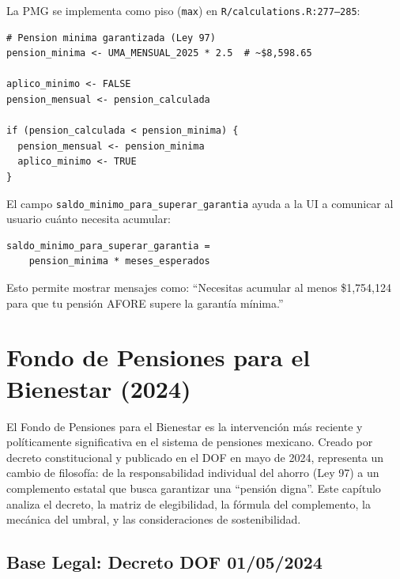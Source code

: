 \documentclass[11pt,a4paper]{report}
\begin{document}
\begin{tcolorbox}[colback=orange!5!white, colframe=orange!75!black, title=\textbf{Aplicaci\'on en C\'odigo}]
La PMG se implementa como piso (\texttt{max}) en \texttt{R/calculations.R:277--285}:

\begin{lstlisting}
# Pension minima garantizada (Ley 97)
pension_minima <- UMA_MENSUAL_2025 * 2.5  # ~$8,598.65

aplico_minimo <- FALSE
pension_mensual <- pension_calculada

if (pension_calculada < pension_minima) {
  pension_mensual <- pension_minima
  aplico_minimo <- TRUE
}
\end{lstlisting}

El campo \texttt{saldo\_minimo\_para\_superar\_garantia} ayuda a la UI a comunicar al usuario cu\'anto necesita acumular:
\begin{lstlisting}
saldo_minimo_para_superar_garantia =
    pension_minima * meses_esperados
\end{lstlisting}

Esto permite mostrar mensajes como: ``Necesitas acumular al menos \$1,754,124 para que tu pensi\'on AFORE supere la garant\'ia m\'inima.''
\end{tcolorbox}

\chapter{Fondo de Pensiones para el Bienestar (2024)}

El Fondo de Pensiones para el Bienestar es la intervenci\'on m\'as reciente y pol\'iticamente significativa en el sistema de pensiones mexicano. Creado por decreto constitucional y publicado en el DOF en mayo de 2024, representa un cambio de filosof\'ia: de la responsabilidad individual del ahorro (Ley 97) a un complemento estatal que busca garantizar una ``pensi\'on digna''. Este cap\'itulo analiza el decreto, la matriz de elegibilidad, la f\'ormula del complemento, la mec\'anica del umbral, y las consideraciones de sostenibilidad.

\section{Base Legal: Decreto DOF 01/05/2024}
\end{document}
